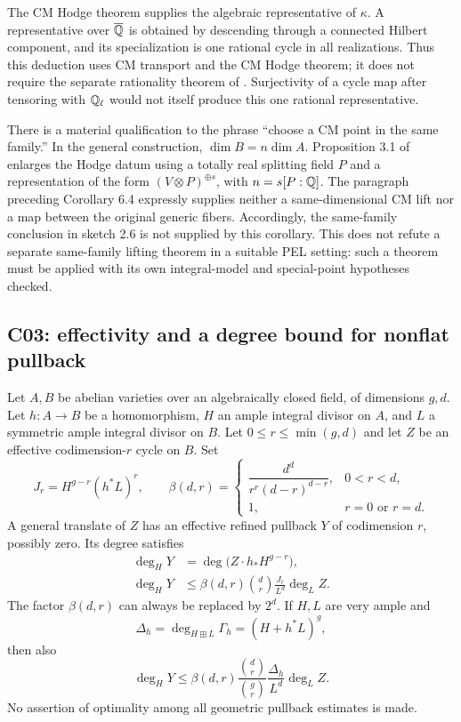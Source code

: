 The CM Hodge theorem \cite[Theorem 1.1]{OAI032} supplies the algebraic representative of $\kappa$. A representative over $\overline{\mathbb Q}$ is obtained by descending through a connected Hilbert component, and its specialization is one rational cycle in all realizations. Thus this deduction uses CM transport and the CM Hodge theorem; it does not require the separate rationality theorem of \cite{OAI001}. Surjectivity of a cycle map after tensoring with $\mathbb Q_\ell$ would not itself produce this one rational representative.

There is a material qualification to the phrase ``choose a CM point in the same family.'' In the general construction, $\dim B=n\dim A$. Proposition 3.1 of \cite{OAI001} enlarges the Hodge datum using a totally real splitting field $P$ and a representation of the form $(V\otimes P)^{\oplus s}$, with $n=s[P:\mathbb Q]$. The paragraph preceding Corollary 6.4 expressly supplies neither a same-dimensional CM lift nor a map between the original generic fibers. Accordingly, the same-family conclusion in sketch 2.6 is not supplied by this corollary. This does not refute a separate same-family lifting theorem in a suitable PEL setting: such a theorem must be applied with its own integral-model and special-point hypotheses checked.

\subsection{C03: effectivity and a degree bound for nonflat pullback}

\begin{proposition}
\label{prop:cm-pullback}
Let $A,B$ be abelian varieties over an algebraically closed field, of dimensions $g,d$. Let $h:A\to B$ be a homomorphism, $H$ an ample integral divisor on $A$, and $L$ a symmetric ample integral divisor on $B$. Let $0\leq r\leq\min(g,d)$ and let $Z$ be an effective codimension-$r$ cycle on $B$. Set
\[
J_r=H^{g-r}(h^*L)^r,\qquad
\beta(d,r)=
\begin{cases}
\dfrac{d^d}{r^r(d-r)^{d-r}},&0<r<d,\\[4pt]
1,&r=0\text{ or }r=d.
\end{cases}
\]
A general translate of $Z$ has an effective refined pullback $Y$ of codimension $r$, possibly zero. Its degree satisfies
\begin{align}
\deg_H Y&=\deg\bigl(Z\cdot h_*H^{g-r}\bigr),
\label{eq:cm-exact-degree}\\
\deg_H Y&\leq
\beta(d,r)\binom dr\frac{J_r}{L^d}\deg_L Z.
\label{eq:cm-nef-bound}
\end{align}
The factor $\beta(d,r)$ can always be replaced by $2^d$. If $H,L$ are very ample and
\[
\Delta_h=\deg_{H\boxplus L}\Gamma_h=(H+h^*L)^g,
\]
then also
\begin{equation}
\deg_HY\leq
\beta(d,r)\frac{\binom dr}{\binom gr}
\frac{\Delta_h}{L^d}\deg_L Z.
\label{eq:cm-graph-bound}
\end{equation}
No assertion of optimality among all geometric pullback estimates is made.
\end{proposition}

